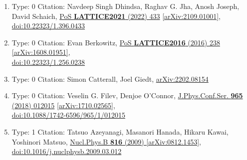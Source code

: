 \documentclass[a4paper,10pt]{article}
\begin{document}
\begin{enumerate}
\begin{enumerate}
  \item Type: 0 Citation: Navdeep Singh Dhindsa, Raghav G. Jha, Anosh Joseph, David Schaich, \href{https://www.doi.org/10.22323/1.396.0433}{PoS {\bf LATTICE2021} (2022) 433}  \href{https://arxiv.org/abs/2109.01001}{[arXiv:2109.01001]},\\\href{https://www.doi.org/10.22323/1.396.0433}{doi:10.22323/1.396.0433}
  \item Type: 0 Citation: Evan Berkowitz, \href{https://www.doi.org/10.22323/1.256.0238}{PoS {\bf LATTICE2016} (2016) 238}  \href{https://arxiv.org/abs/1608.01951}{[arXiv:1608.01951]},\\\href{https://www.doi.org/10.22323/1.256.0238}{doi:10.22323/1.256.0238}
  \item Type: 0 Citation: Simon Catterall, Joel Giedt, \href{https://arxiv.org/abs/2202.08154}{arXiv:2202.08154}
  \item Type: 0 Citation: Veselin G. Filev, Denjoe O'Connor, \href{https://www.doi.org/10.1088/1742-6596/965/1/012015}{J.Phys.Conf.Ser. {\bf 965} (2018) 012015}  \href{https://arxiv.org/abs/1710.02565}{[arXiv:1710.02565]},\\\href{https://www.doi.org/10.1088/1742-6596/965/1/012015}{doi:10.1088/1742-6596/965/1/012015}
  \item Type: 1 Citation: Tatsuo Azeyanagi, Masanori Hanada, Hikaru Kawai, Yoshinori Matsuo, \href{https://www.doi.org/10.1016/j.nuclphysb.2009.03.012}{Nucl.Phys.B {\bf 816} (2009) }  \href{https://arxiv.org/abs/0812.1453}{[arXiv:0812.1453]},\\\href{https://www.doi.org/10.1016/j.nuclphysb.2009.03.012}{doi:10.1016/j.nuclphysb.2009.03.012}

\end{enumerate}
\end{enumerate}
\end{document}
